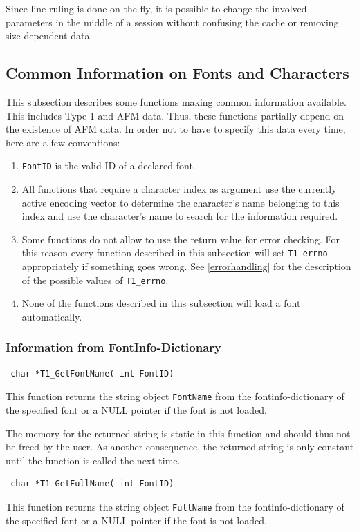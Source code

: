 Since line ruling is done on the fly, it is possible to change the involved
parameters in the middle of a session without confusing the cache or removing
size dependent data.


\subsection{Common Information on Fonts and Characters}
\label{common}%
This subsection describes some functions making common information
available. This includes Type 1 and AFM data. Thus, these
functions partially depend on the existence of AFM data. In order not
to have to specify this data every time, here are a few conventions:
\begin{enumerate}
\item \verb+FontID+ is the valid ID of a declared font.   
\item All functions that require a character index as argument
  use the currently active encoding vector to determine the
  character's name 
  belonging to this index and use the character's name to search for the
  information required.
\item Some functions do not allow to use the return value for error
  checking. For this reason every function described in this subsection will
  set \verb+T1_errno+ appropriately if something goes wrong. See
  \ref{errorhandling} for the description of the possible values of
  \verb+T1_errno+. 
\item None of the functions described in this subsection will load a font
  automatically. 
\end{enumerate}

\subsubsection{Information from FontInfo-Dictionary}
\label{fontinfodict}%
\precorr
\begin{verbatim}
 char *T1_GetFontName( int FontID)
\end{verbatim}\postcorr
This function returns the string object \verb+FontName+ from the
fontinfo-dictionary of the specified font or a NULL pointer if the font is not
loaded.

The memory for the returned string is static in this function and should thus
not be freed by the user. As another consequence, the returned
string is only constant until the function is called the next time.

\precorr
\begin{verbatim}
 char *T1_GetFullName( int FontID)
\end{verbatim}\postcorr
This function returns the string object \verb+FullName+ from the
fontinfo-dictionary of the specified font or a NULL pointer if the font is not
loaded.

